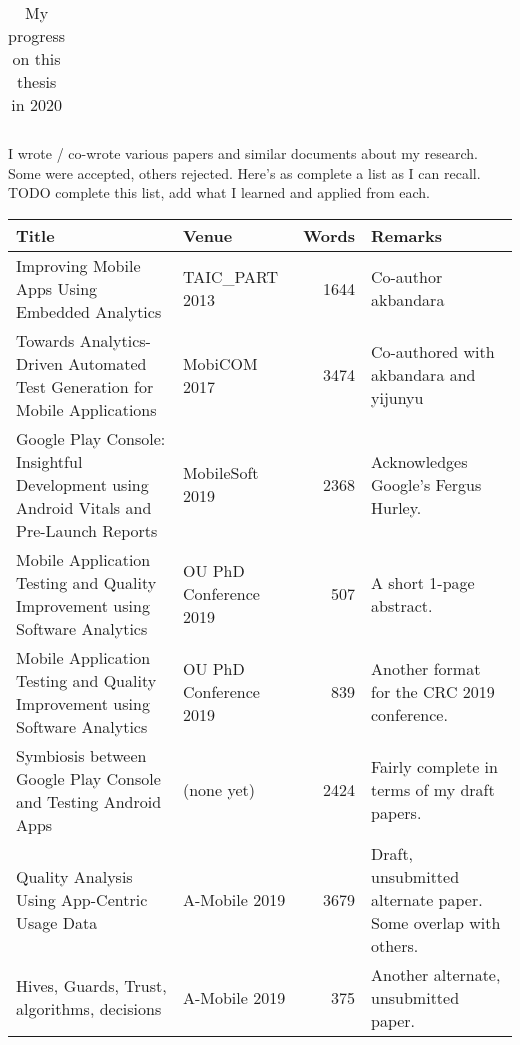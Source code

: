 \begin{table}[htpb]
\begin{tabular}{r|r|l|p{7.5cm}}
    \end{tabular}
    \caption{My progress on this thesis in 2020}
    \label{tab:my_progress_on_this_thesis_2020}
\end{table}

I wrote / co-wrote various papers and similar documents about my research. Some were accepted, others rejected. Here's as complete a list as I can recall. TODO complete this list, add what I learned and applied from each.

\begin{table}[htpb]
    \centering
    \footnotesize
    \begin{tabular}{p{4.3cm}|p{1.9cm}|r|p{4.7cm}}
     Title &Venue &Words &Remarks\\
     
     \hline
     Improving Mobile Apps Using Embedded Analytics &TAIC\_PART 2013 &1644 &Co-author akbandara \\
     
     \hline
     Towards Analytics-Driven Automated Test Generation for Mobile Applications &MobiCOM 2017 &3474 &Co-authored with akbandara and yijunyu \\
     
     \hline
     Google Play Console: Insightful Development using Android Vitals and Pre-Launch Reports &MobileSoft 2019 &2368 &Acknowledges Google's Fergus Hurley.\\
     
     Mobile Application Testing and Quality Improvement using Software Analytics &OU PhD Conference 2019 &507 &A short 1-page abstract.\\
     
     Mobile Application Testing and Quality Improvement using Software Analytics &OU PhD Conference 2019 &839 &Another format for the CRC 2019 conference.\\
     
     Symbiosis between Google Play Console and Testing Android Apps &(none yet) &2424 &Fairly complete in terms of my draft papers.\\
     
     Quality Analysis Using App-Centric Usage Data &A-Mobile 2019 &3679 &Draft, unsubmitted alternate paper. Some overlap with others.\\
     
     Hives, Guards, Trust, algorithms, decisions &A-Mobile 2019 &375 &Another alternate, unsubmitted paper.\\
     

\end{tabular}
\end{table}

